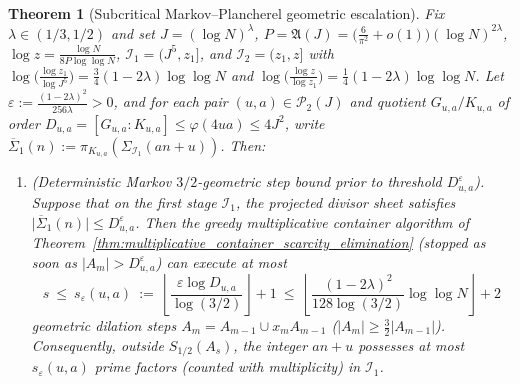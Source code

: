 \documentclass[11pt, a4paper]{article}
\theoremstyle{plain}
\newtheorem{theorem}{Theorem}[section]
\theoremstyle{definition}
\begin{document}
\begin{theorem}[Subcritical Markov--Plancherel geometric escalation]\label{thm:markov_plancherel_subcritical_escalation}
Fix $\lambda\in(1/3,1/2)$ and set $J=(\log N)^{\lambda}$, $P=\mathfrak{A}(J)=\big(\frac{6}{\pi^{2}}+o(1)\big)(\log N)^{2\lambda}$, $\log z=\frac{\log N}{8P\log\log N}$, $\mathcal{I}_1=(J^{5},z_1]$, and $\mathcal{I}_2=(z_1,z]$ with $\log\big(\frac{\log z_1}{\log J^{5}}\big)=\allowbreak\frac34(1-2\lambda)\log\log N$ and $\log\big(\frac{\log z}{\log z_1}\big)=\allowbreak\frac14(1-2\lambda)\log\log N$. Let $\varepsilon:=\frac{(1-2\lambda)^{2}}{256\lambda}>0$, and for each pair $(u,a)\in\mathcal{P}_2(J)$ and quotient $G_{u,a}/K_{u,a}$ of order $D_{u,a}=\allowbreak[G_{u,a}:K_{u,a}]\le\allowbreak\varphi(4ua)\le 4J^{2}$, write $\overline{\Sigma}_1(n):=\allowbreak\pi_{K_{u,a}}(\Sigma_{\mathcal{I}_1}(an+u))$. Then:
\begin{enumerate}[label=(\alph*)]
    \item \emph{(Deterministic Markov $3/2$-geometric step bound prior to threshold $D_{u,a}^{\varepsilon}$).} 
    Suppose that on the first stage $\mathcal{I}_1$, the projected divisor sheet satisfies $\big|\overline{\Sigma}_1(n)\big|\le D_{u,a}^{\varepsilon}$. Then the greedy multiplicative container algorithm of Theorem~\ref{thm:multiplicative_container_scarcity_elimination} (stopped as soon as $|A_m|>D_{u,a}^{\varepsilon}$) can execute at most
    \begin{equation}\label{eq:s_eps_markov_bound}
    s\ \le\ s_\varepsilon(u,a)\ :=\ \left\lfloor\frac{\varepsilon\log D_{u,a}}{\log(3/2)}\right\rfloor+1\ \le\ \left\lfloor\frac{(1-2\lambda)^{2}}{128\log(3/2)}\log\log N\right\rfloor+2
    \end{equation}
    geometric dilation steps $A_m=A_{m-1}\cup x_m A_{m-1}$ ($|A_m|\ge\frac32|A_{m-1}|$). Consequently, outside $S_{1/2}(A_s)$, the integer $an+u$ possesses at most $s_\varepsilon(u,a)$ prime factors (counted with multiplicity) in $\mathcal{I}_1$.
    

\end{enumerate}
\end{theorem}
\end{document}
